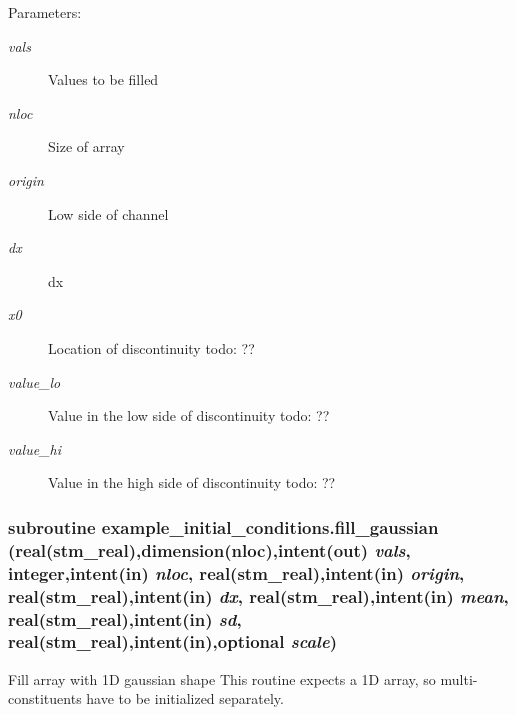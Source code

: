 \begin{Desc}
\item[Parameters:]
\begin{description}
\item[{\em vals}]Values to be filled\item[{\em nloc}]Size of array\item[{\em origin}]Low side of channel \item[{\em dx}]dx\item[{\em x0}]Location of discontinuity todo: ??\item[{\em value\_\-lo}]Value in the low side of discontinuity todo: ??\item[{\em value\_\-hi}]Value in the high side of discontinuity todo: ?? \end{description}
\end{Desc}
\hypertarget{a00059_82460386f586c07daecf8f604347e82b}{
\subsubsection[{fill\_\-gaussian}]{\setlength{\rightskip}{0pt plus 5cm}subroutine example\_\-initial\_\-conditions.fill\_\-gaussian (real(stm\_\-real),dimension(nloc),intent(out) {\em vals}, \/  integer,intent(in) {\em nloc}, \/  real(stm\_\-real),intent(in) {\em origin}, \/  real(stm\_\-real),intent(in) {\em dx}, \/  real(stm\_\-real),intent(in) {\em mean}, \/  real(stm\_\-real),intent(in) {\em sd}, \/  real(stm\_\-real),intent(in),optional {\em scale})}}
\label{a00059_82460386f586c07daecf8f604347e82b}


Fill array with 1D gaussian shape This routine expects a 1D array, so multi-constituents have to be initialized separately. 

